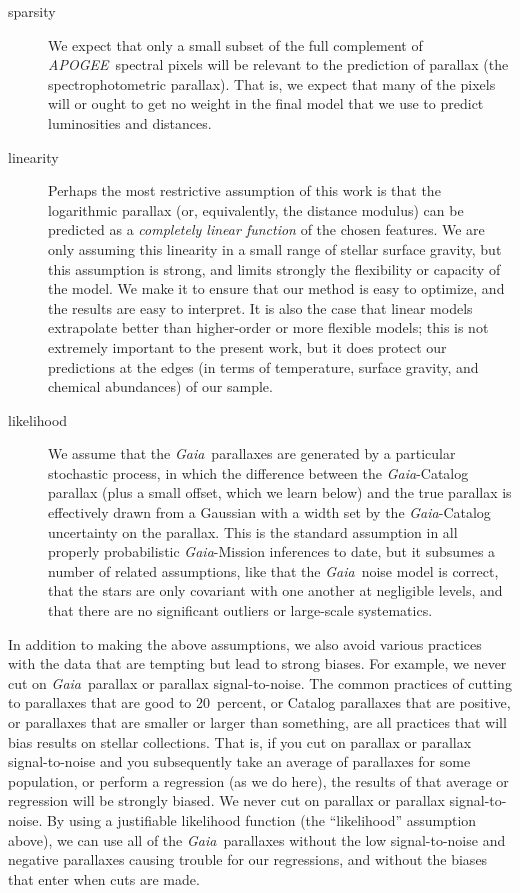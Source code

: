 \documentclass[modern]{aastex62}
\newcommand{\acronym}[1]{{\small{#1}}}
\newcommand{\project}[1]{\textsl{#1}}
\newcommand{\apogee}{\project{\acronym{APOGEE}}}
\newcommand{\gaia}{\project{Gaia}}
\begin{document}
\begin{description}
\item[sparsity] We expect that only a small subset of the full complement of
\apogee\ spectral pixels will be relevant to the prediction of parallax
(the spectrophotometric parallax).
That is, we expect that many of the pixels will or ought to get no weight in the
final model that we use to predict luminosities and distances.

\item[linearity] Perhaps the most restrictive assumption of this work is that
the logarithmic parallax (or, equivalently, the distance modulus) 
can be predicted as a \emph{completely linear function} of
the chosen features. We are only assuming this linearity in a small range of stellar
surface gravity, but this assumption is strong, and limits strongly the
flexibility or capacity of the model.
We make it to ensure that our method is easy to optimize, and the results are easy
to interpret.
It is also the case that linear models extrapolate better than higher-order or more
flexible models; this is not extremely important to the present work, but it does
protect our predictions at the edges (in terms of temperature, surface gravity,
and chemical abundances) of our sample.

\item[likelihood] We assume that the \gaia\ parallaxes are generated by a particular
stochastic process, in which the difference between the \gaia-Catalog parallax (plus
a small offset, which we learn below) and the true parallax is effectively drawn from a
Gaussian with a width set by the \gaia-Catalog uncertainty on the parallax.
This is the standard assumption in all properly probabilistic \gaia-Mission inferences
to date, but it subsumes a number of related assumptions, like that the \gaia\ noise
model is correct, that the stars are only covariant with one another at negligible levels, and that
there are no significant outliers or large-scale systematics.
\end{description}

In addition to making the above assumptions, we also avoid various practices
with the data that are tempting but lead to strong biases.
For example, we never cut on \gaia\ parallax or parallax signal-to-noise.
The common practices of cutting to parallaxes that are good to 20~percent,
or Catalog parallaxes that are positive, or parallaxes that are smaller or
larger than something, are all practices that will bias results on stellar
collections.
That is, if you cut on parallax or parallax signal-to-noise and you subsequently
take an average of parallaxes for some population, or perform a regression (as we
do here), the results of that average or regression will be strongly biased.
We never cut on parallax or parallax signal-to-noise.
By using a justifiable likelihood function (the ``likelihood'' assumption above),
we can use all of the \gaia\ parallaxes without the low signal-to-noise and
negative parallaxes causing trouble for our regressions, and without the biases
that enter when cuts are made.
\end{document}

